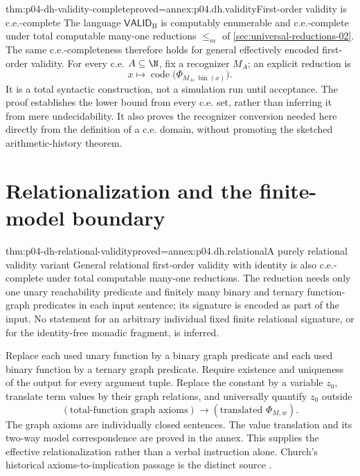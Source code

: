 \begin{hbtheorem}{thm:p04-dh-validity-complete}{proved=annex:p04.dh.validity}{First-order validity is c.e.-complete}
The language \(\mathsf{VALID}_{\mathrm H}\) is computably enumerable
and c.e.-complete under total computable many-one reductions
\(\leq_m\) of \cref{sec:universal-reductions-02}. The same c.e.-completeness
therefore holds for general effectively encoded first-order validity.
For every c.e. \(A\subseteq\N\), fix a recognizer \(M_A\); an explicit
reduction is
\[
 x\longmapsto
 \operatorname{code}\bigl(\Phi_{M_A,\operatorname{bin}(x)}\bigr).
\]
It is a total syntactic construction, not a simulation run until
acceptance. The proof establishes the lower bound from every c.e. set,
rather than inferring it from mere undecidability. It also proves the
recognizer conversion needed here directly from the definition of a
c.e. domain, without promoting the sketched arithmetic-history theorem.
\end{hbtheorem}

\section{Relationalization and the finite-model boundary}
\label{sec:p04-dh-boundaries}

\begin{hbtheorem}{thm:p04-dh-relational-validity}{proved=annex:p04.dh.relational}{A purely relational validity variant}
General relational first-order validity with identity is also c.e.-complete
under total computable many-one reductions. The reduction needs only
one unary reachability predicate and finitely many binary and ternary
function-graph predicates in each input sentence; its signature is encoded
as part of the input. No statement for an arbitrary individual fixed
finite relational signature, or for the identity-free monadic fragment,
is inferred.
\end{hbtheorem}

Replace each used unary function by a binary graph predicate and each used
binary function by a ternary graph predicate. Require existence and uniqueness
of the output for every argument tuple. Replace the constant by a variable
\(z_0\), translate term values by their graph relations, and universally
quantify \(z_0\) outside
\[
 (\text{total-function graph axioms})\to
       (\text{translated }\Phi_{M,w}).
\]
The graph axioms are individually closed sentences. The value translation
and its two-way model correspondence are proved in the annex. This supplies
the effective relationalization rather than a verbal instruction alone.
Church's historical axioms-to-implication passage is the distinct source
\cite[pp.~40--41]{Church1936DecisionNote}.


